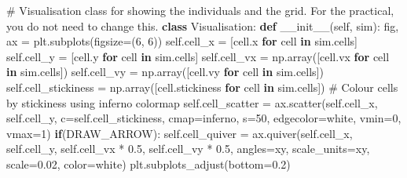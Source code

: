 \documentclass[
  letterpaper,
  DIV=11,
  numbers=noendperiod]{scrreprt}
\newenvironment{Shaded}{\begin{snugshade}}{\end{snugshade}}
\newcommand{\CommentTok}[1]{\textcolor[rgb]{0.37,0.37,0.37}{#1}}
\newcommand{\ControlFlowTok}[1]{\textcolor[rgb]{0.00,0.23,0.31}{\textbf{#1}}}
\newcommand{\DecValTok}[1]{\textcolor[rgb]{0.68,0.00,0.00}{#1}}
\newcommand{\FloatTok}[1]{\textcolor[rgb]{0.68,0.00,0.00}{#1}}
\newcommand{\FunctionTok}[1]{\textcolor[rgb]{0.28,0.35,0.67}{#1}}
\newcommand{\KeywordTok}[1]{\textcolor[rgb]{0.00,0.23,0.31}{\textbf{#1}}}
\newcommand{\NormalTok}[1]{\textcolor[rgb]{0.00,0.23,0.31}{#1}}
\newcommand{\OperatorTok}[1]{\textcolor[rgb]{0.37,0.37,0.37}{#1}}
\newcommand{\StringTok}[1]{\textcolor[rgb]{0.13,0.47,0.30}{#1}}
\newcommand{\VariableTok}[1]{\textcolor[rgb]{0.07,0.07,0.07}{#1}}
\theoremstyle{definition}
\theoremstyle{remark}
\begin{document}
\begin{tcolorbox}
\begin{Shaded}
\begin{Highlighting}[]
\CommentTok{\# Visualisation class for showing the individuals and the grid. For the practical, you do not need to change this. }
\KeywordTok{class}\NormalTok{ Visualisation:    }
    \KeywordTok{def} \FunctionTok{\_\_init\_\_}\NormalTok{(}\VariableTok{self}\NormalTok{, sim):}
\NormalTok{        fig, ax }\OperatorTok{=}\NormalTok{ plt.subplots(figsize}\OperatorTok{=}\NormalTok{(}\DecValTok{6}\NormalTok{, }\DecValTok{6}\NormalTok{))}
        \VariableTok{self}\NormalTok{.cell\_x }\OperatorTok{=}\NormalTok{ [cell.x }\ControlFlowTok{for}\NormalTok{ cell }\KeywordTok{in}\NormalTok{ sim.cells]}
        \VariableTok{self}\NormalTok{.cell\_y }\OperatorTok{=}\NormalTok{ [cell.y }\ControlFlowTok{for}\NormalTok{ cell }\KeywordTok{in}\NormalTok{ sim.cells]}
        \VariableTok{self}\NormalTok{.cell\_vx }\OperatorTok{=}\NormalTok{ np.array([cell.vx }\ControlFlowTok{for}\NormalTok{ cell }\KeywordTok{in}\NormalTok{ sim.cells])}
        \VariableTok{self}\NormalTok{.cell\_vy }\OperatorTok{=}\NormalTok{ np.array([cell.vy }\ControlFlowTok{for}\NormalTok{ cell }\KeywordTok{in}\NormalTok{ sim.cells])}
        \VariableTok{self}\NormalTok{.cell\_stickiness }\OperatorTok{=}\NormalTok{ np.array([cell.stickiness }\ControlFlowTok{for}\NormalTok{ cell }\KeywordTok{in}\NormalTok{ sim.cells])}
        \CommentTok{\# Colour cells by stickiness using inferno colormap}
        \VariableTok{self}\NormalTok{.cell\_scatter }\OperatorTok{=}\NormalTok{ ax.scatter(}\VariableTok{self}\NormalTok{.cell\_x, }\VariableTok{self}\NormalTok{.cell\_y, c}\OperatorTok{=}\VariableTok{self}\NormalTok{.cell\_stickiness, cmap}\OperatorTok{=}\StringTok{\textquotesingle{}inferno\textquotesingle{}}\NormalTok{, s}\OperatorTok{=}\DecValTok{50}\NormalTok{, edgecolor}\OperatorTok{=}\StringTok{\textquotesingle{}white\textquotesingle{}}\NormalTok{, vmin}\OperatorTok{=}\DecValTok{0}\NormalTok{, vmax}\OperatorTok{=}\DecValTok{1}\NormalTok{)}
        \ControlFlowTok{if}\NormalTok{(DRAW\_ARROW): }\VariableTok{self}\NormalTok{.cell\_quiver }\OperatorTok{=}\NormalTok{ ax.quiver(}\VariableTok{self}\NormalTok{.cell\_x, }\VariableTok{self}\NormalTok{.cell\_y, }\VariableTok{self}\NormalTok{.cell\_vx }\OperatorTok{*} \FloatTok{0.5}\NormalTok{, }\VariableTok{self}\NormalTok{.cell\_vy }\OperatorTok{*} \FloatTok{0.5}\NormalTok{, angles}\OperatorTok{=}\StringTok{\textquotesingle{}xy\textquotesingle{}}\NormalTok{, scale\_units}\OperatorTok{=}\StringTok{\textquotesingle{}xy\textquotesingle{}}\NormalTok{, scale}\OperatorTok{=}\FloatTok{0.02}\NormalTok{, color}\OperatorTok{=}\StringTok{\textquotesingle{}white\textquotesingle{}}\NormalTok{)}
\NormalTok{        plt.subplots\_adjust(bottom}\OperatorTok{=}\FloatTok{0.2}\NormalTok{)}


\end{Highlighting}
\end{Shaded}
\end{tcolorbox}
\end{document}
